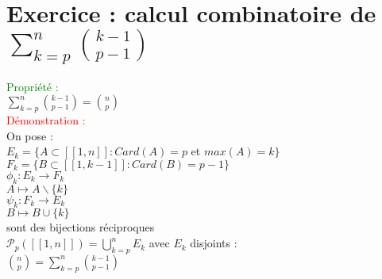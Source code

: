 \documentclass{article}
\begin{document}
\section{Exercice : calcul combinatoire de $\sum_{k=p}^n \binom{k-1}{p-1} $ }
\textcolor{green}{Propriété :} \\
$\sum_{k=p}^n \binom{k-1}{p-1}= \binom{n}{p} $ \\
\textcolor{red}{Démonstration :} \\
On pose : \\
$E_k= \lbrace A \subset [[1,n]] : Card(A)=p$ et $max(A)=k \rbrace$ \\
$F_k=\lbrace B \subset [[1,k-1]] : Card(B)=p-1 \rbrace$ \\
$\phi_k : E_k \rightarrow F_k$ \\
$A \mapsto A \backslash \lbrace k \rbrace$ \\
$\psi_k : F_k \rightarrow E_k$ \\
$B \mapsto B \cup \lbrace k \rbrace $ \\
sont des bijections réciproques \\
$\mathcal P_p([[ 1,n ]] )= \bigcup_{k=p}^n E_k$  avec $E_k$ disjoints : \\
$\binom{n}{p}= \sum^n_{k=p} \binom{k-1}{p-1}$
\end{document}
